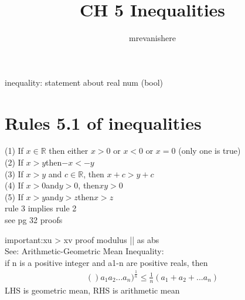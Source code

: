 \documentclass[12pt]{article}
\newcommand{\R}{\mathbb{R}}
\begin{document}
\title{CH 5 Inequalities}
\author{mrevanishere}
\maketitle

inequality: statement about real num (bool)
\section{Rules 5.1 of inequalities}
	(1) If $ x\in\R $ then either $ x>0 $ or $ x<0 $ or $ x=0 $ (only one is true)\\
	(2) If $ x>y $then$ -x<-y $\\
	(3) If $ x>y $ and $ c\in\R $, then $ x+c>y+c $ \\
	(4) If $ x>0 $and$ y>0 $, then$ xy>0 $\\
	(5) If $ x>y $and$ y>z $then$ x>z $ \\
	rule 3 implies rule 2 \\
	see pg 32 proofs

	important:xu > xv proof
	modulus || as abs \\
	See: Arithmetic-Geometric Mean Inequality: \\
	if n is a positive integer and a1-n are positive reals, then
		\begin{align*}
			()a_1a_2...a_n)^{\frac{1}{n}}\le \frac{1}{n}(a_1+a_2+...a_n)
		\end{align*}
	LHS is geometric mean, RHS is arithmetic mean
\end{document}
